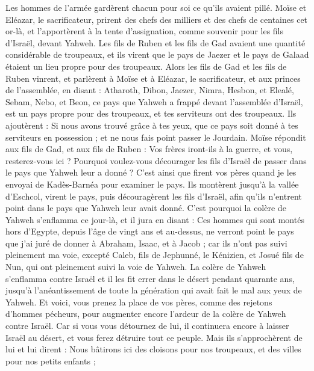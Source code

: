 \begin{multicols}{2}
Les hommes de l'armée gardèrent chacun pour soi ce qu'ils avaient pillé.
Moïse et Eléazar, le sacrificateur, prirent des chefs des milliers et des chefs de centaines cet or-là, et l'apportèrent à la tente d'assignation, comme souvenir pour les fils d'Israël, devant Yahweh.
\VerseOne{}Les fils de Ruben et les fils de Gad avaient une quantité considérable de troupeaux, et ils virent que le pays de Jaezer et le pays de Galaad étaient un lieu propre pour des troupeaux.
Alors les fils de Gad et les fils de Ruben vinrent, et parlèrent à Moïse et à Eléazar, le sacrificateur, et aux princes de l'assemblée, en disant :
Atharoth, Dibon, Jaezer, Nimra, Hesbon, et Elealé, Sebam, Nebo, et Beon,
ce pays que Yahweh a frappé devant l'assemblée d'Israël, est un pays propre pour des troupeaux, et tes serviteurs ont des troupeaux.
Ils ajoutèrent : Si nous avons trouvé grâce à tes yeux, que ce pays soit donné à tes serviteurs en possession ; et ne nous fais point passer le Jourdain.
Moïse répondit aux fils de Gad, et aux fils de Ruben : Vos frères iront-ils à la guerre, et vous, resterez-vous ici ?
Pourquoi voulez-vous décourager les fils d'Israël de passer dans le pays que Yahweh leur a donné ?
C'est ainsi que firent vos pères quand je les envoyai de Kadès-Barnéa pour examiner le pays.
Ils montèrent jusqu'à la vallée d'Eschcol, virent le pays, puis découragèrent les fils d'Israël, afin qu'ils n'entrent point dans le pays que Yahweh leur avait donné.
C'est pourquoi la colère de Yahweh s'enflamma ce jour-là, et il jura en disant :
Ces hommes qui sont montés hors d'Egypte, depuis l'âge de vingt ans et au-dessus, ne verront point le pays que j'ai juré de donner à Abraham, Isaac, et à Jacob ; car ils n'ont pas suivi pleinement ma voie,
excepté Caleb, fils de Jephunné, le Kénizien, et Josué fils de Nun, qui ont pleinement suivi la voie de Yahweh.
La colère de Yahweh s'enflamma contre Israël et il les fit errer dans le désert pendant quarante ans, jusqu'à l'anéantissement de toute la génération qui avait fait le mal aux yeux de Yahweh.
Et voici, vous prenez la place de vos pères, comme des rejetons d'hommes pécheurs, pour augmenter encore l'ardeur de la colère de Yahweh contre Israël.
Car si vous vous détournez de lui, il continuera encore à laisser Israël au désert, et vous ferez détruire tout ce peuple.
Mais ils s'approchèrent de lui et lui dirent : Nous bâtirons ici des cloisons pour nos troupeaux, et des villes pour nos petits enfants ;

\end{multicols}
